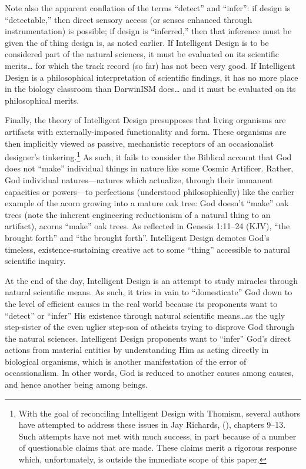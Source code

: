 Note also the apparent conflation of the terms ``detect'' and ``infer'': if design is ``detectable,'' then direct sensory access (or senses enhanced through instrumentation) is possible; if design is ``inferred,'' then that inference must be  given the  of thing design is, as noted earlier. If Intelligent Design is to be considered part of the natural sciences, it must be evaluated on its scientific merits\ldots{} for which the track record (so far) has not been very good. If Intelligent Design is a philosophical interpretation of scientific findings, it has no more place in the biology classroom than DarwinISM does\ldots{} and it must be evaluated on its philosophical merits.

Finally, the theory of Intelligent Design presupposes that living organisms are artifacts with externally-imposed functionality and form. These organisms are then implicitly viewed as passive, mechanistic receptors of an occasionalist designer's tinkering.\footnote{With the goal of reconciling Intelligent Design with Thomism, several authors have attempted to address these issues in Jay Richards,  (\citeyear{richards2010}), chapters 9--13. Such attempts have not met with much success, in part because of a number of questionable claims that are made. These claims merit a rigorous response which, unfortunately, is outside the immediate scope of this paper.} 
As such, it fails to consider the Biblical account that God does not ``make'' individual things in nature like some Cosmic Artificer. Rather, God  individual natures---natures which actualize, through their immanent capacities or powers---to perfections (understood philosophically) like the earlier example of the acorn growing into a mature oak tree: God doesn't ``make'' oak trees (note the inherent engineering reductionism of a natural thing to an artifact), acorns ``make'' oak trees. As reflected in Genesis 1:11--24 (KJV), ``the  brought forth'' and ``the  brought forth''. Intelligent Design demotes God's timeless, existence-sustaining creative act to some ``thing'' accessible to natural scientific inquiry.

At the end of the day, Intelligent Design is an attempt to study miracles through natural scientific means. As such, it tries in vain to ``domesticate'' God down to the level of efficient causes in the real world because its proponents want to ``detect'' or ``infer'' His existence  through natural scientific means\ldots as the ugly step-sister of the even uglier step-son of atheists trying to disprove God through the natural sciences. Intelligent Design proponents want to ``infer'' God's direct actions from material entities by understanding Him as acting directly in biological organisms, which is another manifestation of the error of occassionalism.  In other words, God is reduced to another causes among causes, and hence another being among beings.

